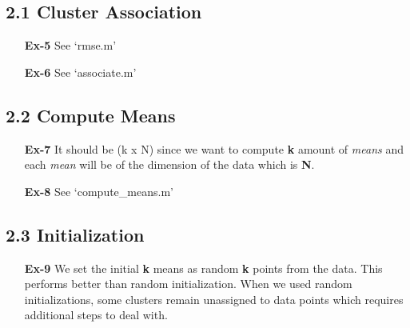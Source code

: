 \documentclass[a4paper]{article}
\begin{document}
\subsection*{2.1 Cluster Association}
\begin{enumerate}
	\item[\textbf{Ex-5}] See `rmse.m'
	\item[\textbf{Ex-6}] See `associate.m'
\end{enumerate}

\subsection*{2.2 Compute Means}
\begin{enumerate}	
	\item[ \textbf{Ex-7} ] It should be (k x N) since we want to compute \textbf{k} amount of \textit{means}  and each \textit{mean} will be of the dimension of the data which is \textbf{N}.
	\item[ \textbf{Ex-8} ] See `compute\_means.m'
\end{enumerate}


\subsection*{2.3 Initialization}
\begin{enumerate}	
	\item[ \textbf{Ex-9} ] 	We set the initial \textbf{k} means as random \textbf{k} points from the data. This performs better than random initialization. When we used random initializations, some clusters remain unassigned to data points which requires additional steps to deal with.
\end{enumerate}
\end{document}
